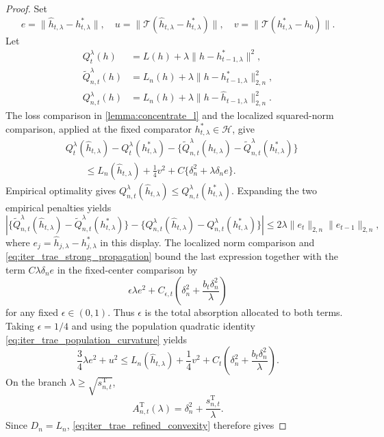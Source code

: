 \begin{proof}
Set
\[
e=\|\hat h_{t,\lambda}-h_{t,\lambda}^*\|,
\quad
u=\|\mathcal T(\hat h_{t,\lambda}-h_{t,\lambda}^*)\|,
\quad
v=\|\mathcal T(h_{t,\lambda}^*-h_0)\|.
\]
Let
\begin{align*}
Q_t^\lambda(h)
&=L(h)+\lambda\|h-h_{t-1,\lambda}^*\|^2,\\
\widetilde Q_{n,t}^\lambda(h)
&=L_n(h)+\lambda\|h-h_{t-1,\lambda}^*\|_{2,n}^2,\\
Q_{n,t}^\lambda(h)
&=L_n(h)+\lambda\|h-\hat h_{t-1,\lambda}\|_{2,n}^2.
\end{align*}
The loss comparison in \cref{lemma:concentrate_l} and the localized
squared-norm comparison, applied at the fixed comparator
$h_{t,\lambda}^*\in\mathcal H$, give
\begin{align*}
&Q_t^\lambda(\hat h_{t,\lambda})-Q_t^\lambda(h_{t,\lambda}^*)
-\{\widetilde Q_{n,t}^\lambda(\hat h_{t,\lambda})
-\widetilde Q_{n,t}^\lambda(h_{t,\lambda}^*)\}\\
&\qquad\leqslant
L_n(\hat h_{t,\lambda})+\frac14v^2
+C\{\delta_n^2+\lambda\delta_ne\}.
\end{align*}
Empirical optimality gives
$Q_{n,t}^\lambda(\hat h_{t,\lambda})
\leqslant Q_{n,t}^\lambda(h_{t,\lambda}^*)$.
Expanding the two empirical penalties yields
\[
\left|
\{\widetilde Q_{n,t}^\lambda(\hat h_{t,\lambda})
-\widetilde Q_{n,t}^\lambda(h_{t,\lambda}^*)\}
-\{Q_{n,t}^\lambda(\hat h_{t,\lambda})
-Q_{n,t}^\lambda(h_{t,\lambda}^*)\}
\right|
\leqslant2\lambda\|e_t\|_{2,n}\|e_{t-1}\|_{2,n},
\]
where $e_j=\hat h_{j,\lambda}-h_{j,\lambda}^*$ in this display.
The localized norm comparison and \eqref{eq:iter_trae_strong_propagation}
bound the last expression together with the term $C\lambda\delta_ne$
in the fixed-center comparison by
\[
\epsilon\lambda e^2 +C_{\epsilon,t}\left( \delta_n^2+\frac{b_t\delta_n^2}{\lambda}\right)
\]
for any fixed $\epsilon\in(0,1)$. Thus $\epsilon$ is the total absorption
allocated to both terms. Taking $\epsilon=1/4$ and using the
population quadratic identity \eqref{eq:iter_trae_population_curvature} yields
\begin{equation}\label{eq:iter_trae_refined_convexity}
\frac34\lambda e^2+u^2
\leqslant
L_n(\hat h_{t,\lambda})+\frac14v^2
+C_t\left(\delta_n^2+\frac{b_t\delta_n^2}{\lambda}\right).
\end{equation}
On the branch $\lambda\geqslant\sqrt{s_{n,t}^{\mathrm T}}$,
\[
A_{n,t}^{\mathrm T}(\lambda) =\delta_n^2+\frac{s_{n,t}^{\mathrm T}}{\lambda}.
\]
Since $D_n=L_n$, \eqref{eq:iter_trae_refined_convexity} therefore gives

\end{proof}
